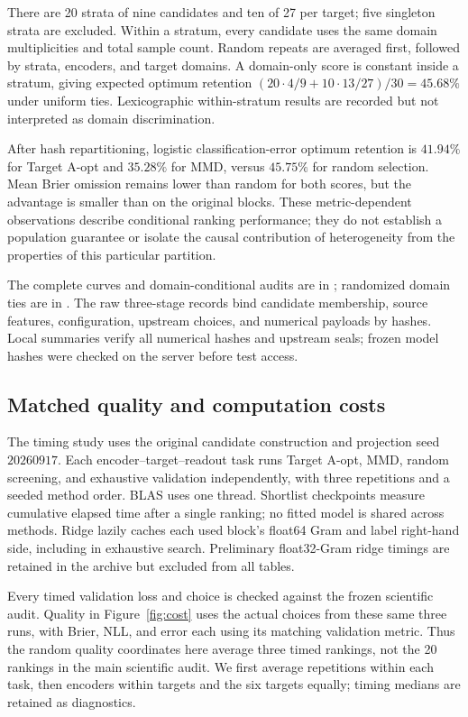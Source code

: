 \documentclass{article}
\begin{document}
There are 20 strata of nine candidates and ten of 27 per target; five singleton strata are excluded. Within a stratum, every candidate uses the same domain multiplicities and total sample count. Random repeats are averaged first, followed by strata, encoders, and target domains. A domain-only score is constant inside a stratum, giving expected optimum retention $(20\cdot4/9+10\cdot13/27)/30=45.68\%$ under uniform ties. Lexicographic within-stratum results are recorded but not interpreted as domain discrimination.

After hash repartitioning, logistic classification-error optimum retention is $41.94\%$ for Target A-opt and $35.28\%$ for MMD, versus $45.75\%$ for random selection. Mean Brier omission remains lower than random for both scores, but the advantage is smaller than on the original blocks. These metric-dependent observations describe conditional ranking performance; they do not establish a population guarantee or isolate the causal contribution of heterogeneity from the properties of this particular partition.

The complete curves and domain-conditional audits are in ; randomized domain ties are in . The raw three-stage records bind candidate membership, source features, configuration, upstream choices, and numerical payloads by hashes. Local summaries verify all numerical hashes and upstream seals; frozen model hashes were checked on the server before test access.

\subsection{Matched quality and computation costs}
\label{app:cost}
The timing study uses the original candidate construction and projection seed $20260917$. Each encoder--target--readout task runs Target A-opt, MMD, random screening, and exhaustive validation independently, with three repetitions and a seeded method order. BLAS uses one thread. Shortlist checkpoints measure cumulative elapsed time after a single ranking; no fitted model is shared across methods. Ridge lazily caches each used block's float64 Gram and label right-hand side, including in exhaustive search. Preliminary float32-Gram ridge timings are retained in the archive but excluded from all tables.

Every timed validation loss and choice is checked against the frozen scientific audit. Quality in Figure~\ref{fig:cost} uses the actual choices from these same three runs, with Brier, NLL, and error each using its matching validation metric. Thus the random quality coordinates here average three timed rankings, not the 20 rankings in the main scientific audit. We first average repetitions within each task, then encoders within targets and the six targets equally; timing medians are retained as diagnostics.
\end{document}
